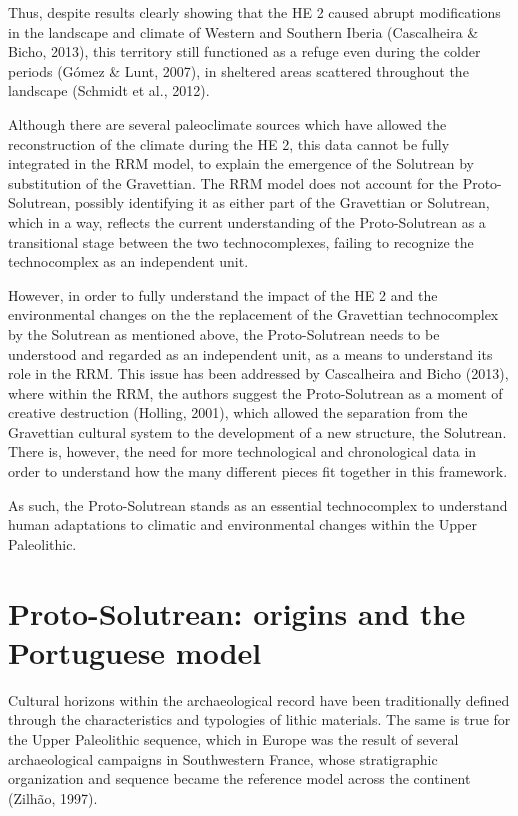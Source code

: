 \documentclass[12pt,twoside]{reedthesis}
\begin{document}
Thus, despite results clearly showing that the HE 2 caused abrupt modifications in the landscape and climate of Western and Southern Iberia (Cascalheira \& Bicho, 2013), this territory still functioned as a refuge even during the colder periods (Gómez \& Lunt, 2007), in sheltered areas scattered throughout the landscape (Schmidt et al., 2012).

Although there are several paleoclimate sources which have allowed the reconstruction of the climate during the HE 2, this data cannot be fully integrated in the RRM model, to explain the emergence of the Solutrean by substitution of the Gravettian. The RRM model does not account for the Proto-Solutrean, possibly identifying it as either part of the Gravettian or Solutrean, which in a way, reflects the current understanding of the Proto-Solutrean as a transitional stage between the two technocomplexes, failing to recognize the technocomplex as an independent unit.

However, in order to fully understand the impact of the HE 2 and the environmental changes on the the replacement of the Gravettian technocomplex by the Solutrean as mentioned above, the Proto-Solutrean needs to be understood and regarded as an independent unit, as a means to understand its role in the RRM. This issue has been addressed by Cascalheira and Bicho (2013), where within the RRM, the authors suggest the Proto-Solutrean as a moment of creative destruction (Holling, 2001), which allowed the separation from the Gravettian cultural system to the development of a new structure, the Solutrean. There is, however, the need for more technological and chronological data in order to understand how the many different pieces fit together in this framework.

As such, the Proto-Solutrean stands as an essential technocomplex to understand human adaptations to climatic and environmental changes within the Upper Paleolithic.

\hypertarget{proto-solutrean-origins-and-the-portuguese-model}{%
\section{Proto-Solutrean: origins and the Portuguese model}\label{proto-solutrean-origins-and-the-portuguese-model}}

Cultural horizons within the archaeological record have been traditionally defined through the characteristics and typologies of lithic materials. The same is true for the Upper Paleolithic sequence, which in Europe was the result of several archaeological campaigns in Southwestern France, whose stratigraphic organization and sequence became the reference model across the continent (Zilhão, 1997).
\end{document}
